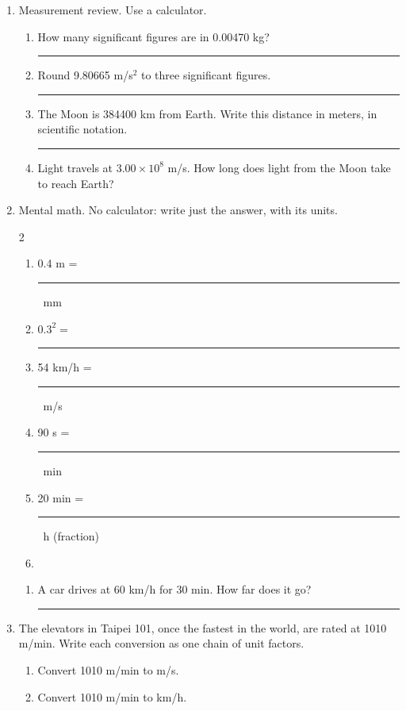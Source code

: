 \documentclass[12pt, twoside]{article}
\newcommand{\blank}[1][2.4cm]{\rule{#1}{0.4pt}}
\begin{document}
\begin{enumerate}[itemsep=0.6cm]

\item Measurement review. Use a calculator.
  \begin{enumerate}[itemsep=0.6cm]
    \item How many significant figures are in \num{0.00470} kg? \hfill \blank
    \item Round 9.80665 m/s$^2$ to three significant figures. \hfill \blank
    \item The Moon is \num{384400} km from Earth. Write this distance in meters, in
      scientific notation. \hfill \blank
    \item Light travels at $3.00 \times 10^{8}$ m/s. How long does light from the
      Moon take to reach Earth?
      \vspace{3.0cm}
  \end{enumerate}

\item Mental math. No calculator: write just the answer, with its units.
  \begin{multicols}{2}
    \begin{enumerate}[itemsep=0.6cm, series=mm]
      \item 0.4 m = \blank\ mm
      \item $0.3^2 = $ \blank
      \item 54 km/h = \blank\ m/s
      \item 90 s = \blank\ min
      \item 20 min = \blank\ h (fraction)
      \item[]
    \end{enumerate}
  \end{multicols}
  \begin{enumerate}[resume=mm, itemsep=0.6cm]
    \item A car drives at 60 km/h for 30 min. How far does it go? \hfill \blank
  \end{enumerate}

\newpage

\item The elevators in Taipei 101, once the fastest in the world, are rated at
  1010 m/min. Write each conversion as one chain of unit factors.
  \begin{enumerate}[itemsep=0.4cm]
    \item Convert 1010 m/min to m/s.
      \vspace{4.5cm}
    \item Convert 1010 m/min to km/h.
      \vspace{4.5cm}
  \end{enumerate}


\end{enumerate}
\end{document}
